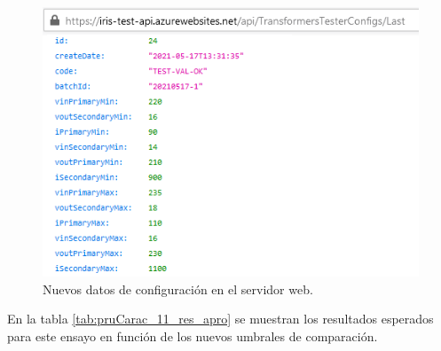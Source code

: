 \pagebreak

\begin{figure}[htpb]
	\centering
	\includegraphics[scale=0.9]{./Figures/serv_web_ok_conf.png}
	\caption{Nuevos datos de configuración en el servidor web.}
	\label{fig:serv_web_ok_conf}
\end{figure}

En la tabla \ref{tab:pruCarac_11_res_apro} se muestran los resultados esperados para este ensayo en función de los nuevos umbrales de comparación.

\begin{table}[htpb]
\centering
\caption[Ensayo para transformador aprobado]{Resultados esperados para el \textit{test path} 11 en la condición de transformador aprobado}
\label{tab:pruCarac_11_res_apro}
\end{table}

